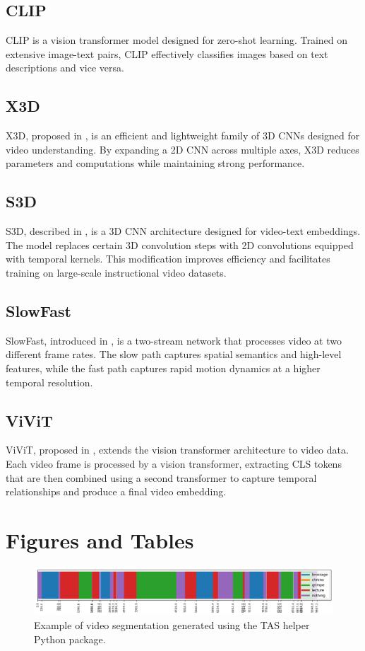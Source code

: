 \subsection*{CLIP}
CLIP is a vision transformer model designed for zero-shot learning. Trained on extensive image-text pairs, CLIP effectively classifies images based on text descriptions and vice versa.

\subsection*{X3D}
X3D, proposed in \cite{x3d}, is an efficient and lightweight family of 3D CNNs designed for video understanding. By expanding a 2D CNN across multiple axes, X3D reduces parameters and computations while maintaining strong performance.

\subsection*{S3D}
S3D, described in \cite{s3d}, is a 3D CNN architecture designed for video-text embeddings. The model replaces certain 3D convolution steps with 2D convolutions equipped with temporal kernels. This modification improves efficiency and facilitates training on large-scale instructional video datasets.

\subsection*{SlowFast}
SlowFast, introduced in \cite{slowfast}, is a two-stream network that processes video at two different frame rates. The slow path captures spatial semantics and high-level features, while the fast path captures rapid motion dynamics at a higher temporal resolution.

\subsection*{ViViT}
ViViT, proposed in \cite{vivit}, extends the vision transformer architecture to video data. Each video frame is processed by a vision transformer, extracting CLS tokens that are then combined using a second transformer to capture temporal relationships and produce a final video embedding.

\newpage
\section{Figures and Tables}



\begin{figure}[!h]
    \centering
    \includegraphics[width=\textwidth]{../../assets/figures/example-of-video-segmentation-1.png}
    \caption{Example of video segmentation generated using the TAS helper Python package.}
    \label{fig:your-label}
\end{figure}